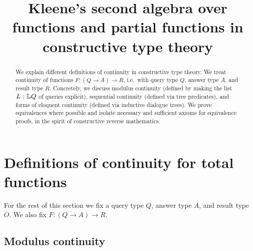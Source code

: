 \documentclass[a4paper,UKenglish,cleveref, autoref, thm-restate]{lipics-v2021}
\title{Kleene's second algebra over functions and partial functions in constructive type theory}
\renewcommand{\pfun}{\rightharpoonup}
\newcommand{\Baire}{\mathcal{B}}
\begin{document}
\maketitle

\begin{abstract}
  We explain different definitions of continuity in constructive type theory.
  We treat continuity of functions $F : (Q \to A) \to R$,
  i.e.\ with query type $Q$,
  answer type $A$,
  and result type $R$.
  Concretely, we discuss
  modulus continuity (defined by making the list $L \of \List Q$ of queries explicit),
  sequential continuity (defined via tree predicates),
  and forms of
  eloquent continuity (defined via inductive dialogue trees).
  We prove equivalences where possible and isolate necessary and sufficient axioms for equivalence proofs,
  in the spirit of constructive reverse mathematics.  


\end{abstract}

\renewcommand\of[1]{: #1}


\section{Definitions of continuity for total functions}

For the rest of this section we fix a query type $Q$,
answer type $A$,
and result type $O$.
We also fix $F \of (Q \to A) \to R$.

\newcommand\f{f}
\newcommand\g{g}

\subsection{Modulus continuity}
\end{document}
